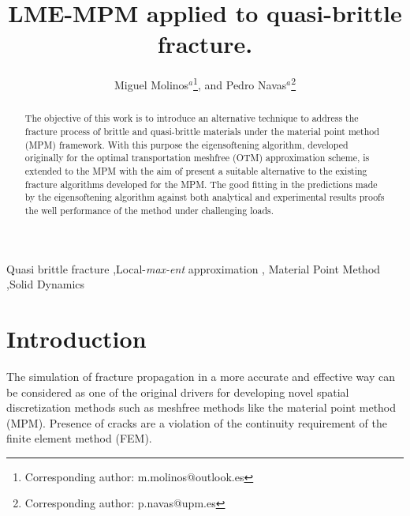 \documentclass[preprint,12pt,a4paper]{elsarticle}
\begin{document}
\begin{frontmatter}

\title{LME-MPM applied to quasi-brittle fracture.}

\author{
Miguel Molinos$^a$\footnote{Corresponding author: m.molinos@outlook.es},
and Pedro Navas$^a$\footnote{Corresponding author: p.navas@upm.es}
 }
 \address{
 $^a$ ETSI Caminos, Canales y Puertos, Universidad Polit\'ectnica de Madrid.\\ c. Prof. Aranguren 3, 28040 Madrid, Spain
}

\begin{abstract}

  The objective of this work is to introduce an alternative
  technique to address the fracture process of brittle and
  quasi-brittle materials under the material point method (MPM)
  framework. With this purpose the eigensoftening algorithm, developed
  originally for the optimal transportation meshfree (OTM)
  approximation scheme, is extended to the MPM with the aim of present
  a suitable alternative to the existing fracture algorithms developed
  for the MPM. The good fitting in the predictions made by the
  eigensoftening algorithm against both analytical and experimental
  results proofs the well performance of the method under challenging loads.

\end{abstract}

\begin{keyword}
Quasi brittle fracture \sep Local-\textit{max-ent} approximation \sep
Material Point Method \sep Solid Dynamics
\end{keyword}

\end{frontmatter}

\linenumbers

\section{Introduction}
\label{sec:1}

The simulation of fracture propagation in a more accurate and
effective way can be considered as one of the original drivers for
developing novel spatial discretization methods such as meshfree
methods like the material point method (MPM). Presence of cracks are a
violation of the continuity requirement of the finite element method
(FEM).  
\end{document}
